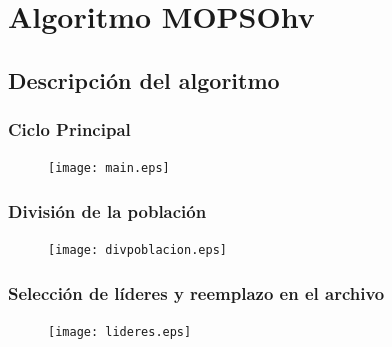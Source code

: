 \documentclass[10pt,compress]{beamer}
\begin{document}
\section{Algoritmo MOPSOhv}
\frame{\tableofcontents[currentsection]}
\subsection{Descripci\'on del algoritmo}
\begin{frame}
\frametitle{Ciclo Principal}  
 \begin{figure}
	\centering
	\texttt{[image: main.eps]}	  
    
      \end{figure}
\end{frame}
\begin{frame}
	\frametitle{Divisi\'on de la poblaci\'on}		
	 \begin{figure}
	\centering
	\texttt{[image: divpoblacion.eps]}	  
      
      \end{figure}
\end{frame}
\begin{frame}
 \frametitle{Selecci\'on de l\'ideres y reemplazo en el archivo}  
\begin{figure}
	\centering
	\texttt{[image: lideres.eps]}	  
      
      \end{figure}
\end{frame}
\end{document}
